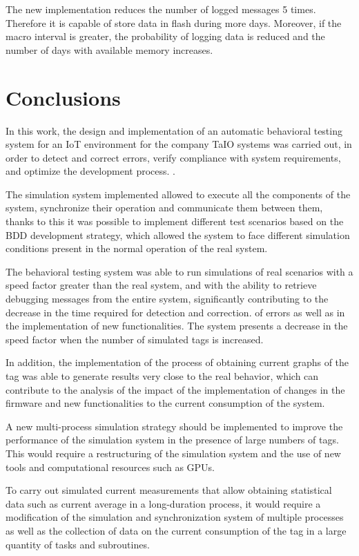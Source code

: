 \documentclass[journal]{IEEEtran}	%
\begin{document}
The new implementation reduces the number of logged messages 5 times. Therefore it is capable of store data in flash during more days. Moreover, if the macro interval is greater, the probability of logging data is reduced and the number of days with available memory increases.

\section{Conclusions}
In this work, the design and implementation of an automatic behavioral testing system for an IoT environment for the company TaIO systems was carried out, in order to detect and correct errors, verify compliance with system requirements, and optimize the development process. .

The simulation system implemented allowed to execute all the components of the system, synchronize their operation and communicate them between them, thanks to this it was possible to implement different test scenarios based on the BDD development strategy, which allowed the system to face different simulation conditions present in the normal operation of the real system.

The behavioral testing system was able to run simulations of real scenarios with a speed factor greater than the real system, and with the ability to retrieve debugging messages from the entire system, significantly contributing to the decrease in the time required for detection and correction. of errors as well as in the implementation of new functionalities. The system presents a decrease in the speed factor when the number of simulated tags is increased.

In addition, the implementation of the process of obtaining current graphs of the tag was able to generate results very close to the real behavior, which can contribute to the analysis of the impact of the implementation of changes in the firmware and new functionalities to the current consumption of the system.

A new multi-process simulation strategy should be implemented to improve the performance of the simulation system in the presence of large numbers of tags. This would require a restructuring of the simulation system and the use of new tools and computational resources such as GPUs.

To carry out simulated current measurements that allow obtaining statistical data such as current average in a long-duration process, it would require a modification of the simulation and synchronization system of multiple processes as well as the collection of data on the current consumption of the tag in a large quantity of tasks and subroutines.
\end{document}
